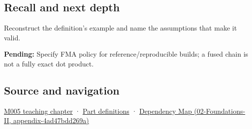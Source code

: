 \subsection{Recall and next depth}\label{appendix-41e8ef22a21e-recall-and-next-depth}

Reconstruct the definition's example and name the assumptions that make it valid.

\textbf{Pending:} Specify FMA policy for reference/reproducible builds; a fused chain is not a fully exact dot product.

\subsection{Source and navigation}\label{appendix-41e8ef22a21e-source-and-navigation}

\hyperref[01-foundations-i-ch001-when-arithmetic-meets-uncertainty]{M005 teaching chapter} · \hyperref[appendix-fd090d982a15-m005---parts-77-88]{Part definitions} · \href{../02-Foundations-II/main.pdf\#nameddest=appendix-4ad47bdd269a}{Dependency Map (02-Foundations-II, appendix-4ad47bdd269a)}
